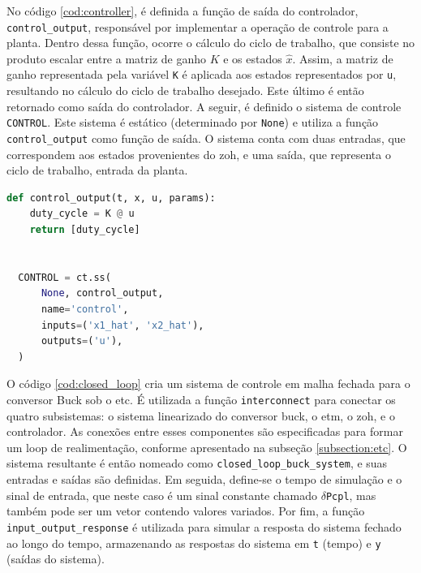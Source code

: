 No código \ref{cod:controller}, é definida a função de saída do controlador, \texttt{control\_output}, responsável por implementar a operação de controle para a planta. Dentro dessa função, ocorre o cálculo do ciclo de trabalho, que consiste no produto escalar entre a matriz de ganho $K$ e os estados $\hat{x}$. Assim, a matriz de ganho representada pela variável \texttt{K} é aplicada aos estados representados por \texttt{u}, resultando no cálculo do ciclo de trabalho desejado. Este último é então retornado como saída do controlador. A seguir, é definido o sistema de controle \texttt{CONTROL}. Este sistema é estático (determinado por \texttt{None}) e utiliza a função \texttt{control\_output} como função de saída. O sistema conta com duas entradas, que correspondem aos estados provenientes do \acrshort{zoh}, e uma saída, que representa o ciclo de trabalho, entrada da planta.

\vspace{8pt}
\begin{lstlisting}[language=Python, caption={Implementação do controlador.}, label=cod:controller]
  def control_output(t, x, u, params):
    duty_cycle = K @ u
    return [duty_cycle]


  CONTROL = ct.ss(
      None, control_output,
      name='control',
      inputs=('x1_hat', 'x2_hat'),
      outputs=('u'),
  )
\end{lstlisting}

O código \ref{cod:closed_loop} cria um sistema de controle em malha fechada para o conversor Buck sob o \acrshort{etc}. É utilizada a função \texttt{interconnect} para conectar os quatro subsistemas: o sistema linearizado do conversor buck, o \acrshort{etm}, o \acrshort{zoh}, e o controlador. As conexões entre esses componentes são especificadas para formar um loop de realimentação, conforme apresentado na subseção \ref{subsection:etc}. O sistema resultante é então nomeado como \texttt{closed\_loop\_buck\_system}, e suas entradas e saídas são definidas. Em seguida, define-se o tempo de simulação e o sinal de entrada, que neste caso é um sinal constante chamado \texttt{\ensuremath{\delta}Pcpl}, mas também pode ser um vetor contendo valores variados. Por fim, a função \texttt{input\_output\_response} é utilizada para simular a resposta do sistema fechado ao longo do tempo, armazenando as respostas do sistema em \texttt{t} (tempo) e \texttt{y} (saídas do sistema).

